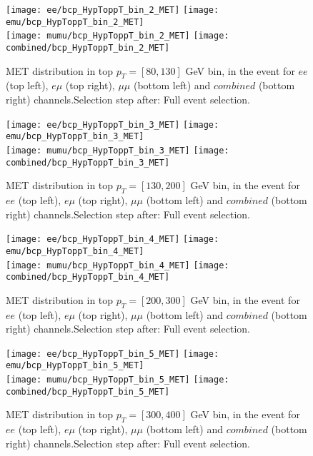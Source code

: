 \clearpage
\newpage


\begin{figure}
  \texttt{[image: ee/bcp\_HypToppT\_bin\_2\_MET]}
  \texttt{[image: emu/bcp\_HypToppT\_bin\_2\_MET]}\\
  \texttt{[image: mumu/bcp\_HypToppT\_bin\_2\_MET]}
  \texttt{[image: combined/bcp\_HypToppT\_bin\_2\_MET]}
\caption{MET distribution in top $p_T = [80,130]$ GeV bin, in the event for $ee$ (top left), $e\mu$ (top right), $\mu\mu$ (bottom left) and $combined$ (bottom right) channels.\newline Selection step after: Full event selection.}
\end{figure}

\clearpage
\newpage


\begin{figure}
  \texttt{[image: ee/bcp\_HypToppT\_bin\_3\_MET]}
  \texttt{[image: emu/bcp\_HypToppT\_bin\_3\_MET]}\\
  \texttt{[image: mumu/bcp\_HypToppT\_bin\_3\_MET]}
  \texttt{[image: combined/bcp\_HypToppT\_bin\_3\_MET]}
\caption{MET distribution in top $p_T = [130,200]$ GeV bin, in the event for $ee$ (top left), $e\mu$ (top right), $\mu\mu$ (bottom left) and $combined$ (bottom right) channels.\newline Selection step after: Full event selection.}
\end{figure}

\clearpage
\newpage

\begin{figure}
  \texttt{[image: ee/bcp\_HypToppT\_bin\_4\_MET]}
  \texttt{[image: emu/bcp\_HypToppT\_bin\_4\_MET]}\\
  \texttt{[image: mumu/bcp\_HypToppT\_bin\_4\_MET]}
  \texttt{[image: combined/bcp\_HypToppT\_bin\_4\_MET]}
\caption{MET distribution in top $p_T = [200,300]$ GeV bin, in the event for $ee$ (top left), $e\mu$ (top right), $\mu\mu$ (bottom left) and $combined$ (bottom right) channels.\newline Selection step after: Full event selection.}
\end{figure}

\clearpage
\newpage


\begin{figure}
  \texttt{[image: ee/bcp\_HypToppT\_bin\_5\_MET]}
  \texttt{[image: emu/bcp\_HypToppT\_bin\_5\_MET]}\\
  \texttt{[image: mumu/bcp\_HypToppT\_bin\_5\_MET]}
  \texttt{[image: combined/bcp\_HypToppT\_bin\_5\_MET]}
\caption{MET distribution in top $p_T = [300,400]$ GeV bin, in the event for $ee$ (top left), $e\mu$ (top right), $\mu\mu$ (bottom left) and $combined$ (bottom right) channels.\newline Selection step after: Full event selection.}
\end{figure}

